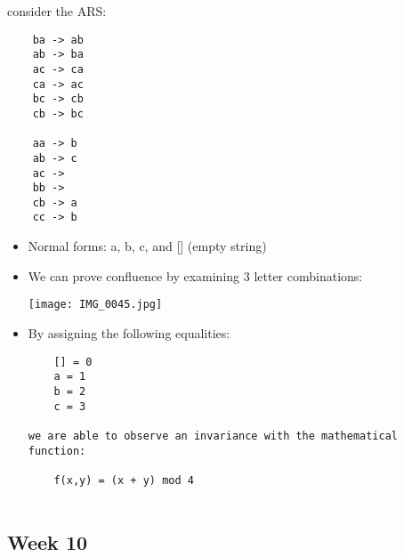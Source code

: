 \documentclass{article}
\theoremstyle{theorem}
\theoremstyle{definition}
\theoremstyle{remark}
\begin{document}
consider the ARS:
\begin{verbatim}
    ba -> ab
    ab -> ba
    ac -> ca
    ca -> ac
    bc -> cb
    cb -> bc
 
    aa -> b
    ab -> c
    ac ->  
    bb ->
    cb -> a
    cc -> b
\end{verbatim}  
\begin{itemize}
\item Normal forms: a, b, c, and [] (empty string)

\item We can prove confluence by examining 3 letter combinations:

\texttt{[image: IMG\_0045.jpg]}

\item By assigning the following equalities:
\begin{verbatim}
    [] = 0
    a = 1
    b = 2
    c = 3

we are able to observe an invariance with the mathematical function:
    
    f(x,y) = (x + y) mod 4
    
\end{verbatim}

\end{itemize}

\subsection{Week 10 }
\end{document}
